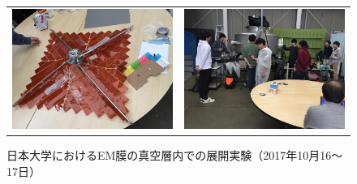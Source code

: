 \begin{figure}[H]
\begin{tabular}{cc}
			\begin{minipage}{0.5\hsize}
		\begin{center}
			\includegraphics[width=1\textwidth]{03/fig/3-9-3-1-11.jpg}
		\end{center}
	\end{minipage}&
	\begin{minipage}{0.5\hsize}
		\begin{center}
			\includegraphics[width=1\textwidth]{03/fig/3-9-3-1-12.jpg}
		\end{center}
	\end{minipage}
	\end{tabular}
	\caption{日本大学におけるEM膜の真空層内での展開実験（2017年10月16～17日）}
	\label{fig3-9-3-1-6}
\end{figure}

